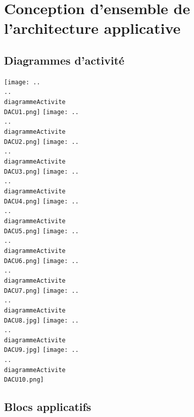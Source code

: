 

\section{Conception d'ensemble de l'architecture applicative}

\subsection{Diagrammes d'activité}

\begin {center}
\texttt{[image: ..\\..\\diagrammeActivite\\DACU1.png]}
\texttt{[image: ..\\..\\diagrammeActivite\\DACU2.png]}
\texttt{[image: ..\\..\\diagrammeActivite\\DACU3.png]}
\texttt{[image: ..\\..\\diagrammeActivite\\DACU4.png]}
\texttt{[image: ..\\..\\diagrammeActivite\\DACU5.png]}
\texttt{[image: ..\\..\\diagrammeActivite\\DACU6.png]}
\texttt{[image: ..\\..\\diagrammeActivite\\DACU7.png]}
\texttt{[image: ..\\..\\diagrammeActivite\\DACU8.jpg]}
\texttt{[image: ..\\..\\diagrammeActivite\\DACU9.jpg]}
\texttt{[image: ..\\..\\diagrammeActivite\\DACU10.png]}
\end {center}

\subsection{Blocs applicatifs}

